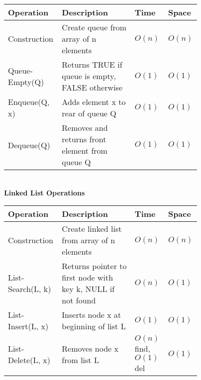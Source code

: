 \documentclass[a4paper]{extarticle}
\begin{document}
\begin{paracol}{3}
{\begin{minipage}[t]{1\linewidth}
\begin{minipage}[t]{1\linewidth}
\begin{tabular}{|p{0.19\linewidth}|p{0.37\linewidth}|p{0.168\linewidth}|p{0.04\linewidth}|}
    \hline
    \textbf{Operation} & \textbf{Description} & \textbf{Time} & \textbf{Space} \\
    \hline
    Construction & Create queue from array of n elements & $O(n)$ & $O(n)$ \\
    \hline
    Queue-Empty(Q) & Returns TRUE if queue is empty, FALSE otherwise & $O(1)$ & $O(1)$ \\
    \hline
    Enqueue(Q, x) & Adds element x to rear of queue Q & $O(1)$ & $O(1)$ \\
    \hline
    Dequeue(Q) & Removes and returns front element from queue Q & $O(1)$ & $O(1)$ \\
    \hline
    \end{tabular}\\
    \textbf{Linked List Operations}\\
    \begin{tabular}{|p{0.19\linewidth}|p{0.37\linewidth}|p{0.168\linewidth}|p{0.04\linewidth}|}
    \hline
    \textbf{Operation} & \textbf{Description} & \textbf{Time} & \textbf{Space} \\
    \hline
    Construction & Create linked list from array of n elements & $O(n)$ & $O(n)$ \\
    \hline
    List-Search(L, k) & Returns pointer to first node with key k, NULL if not found & $O(n)$ & $O(1)$ \\
    \hline
    List-Insert(L, x) & Inserts node x at beginning of list L & $O(1)$ & $O(1)$ \\
    \hline
    List-Delete(L, x) & Removes node x from list L & $O(n)$ find, $O(1)$ del & $O(1)$ \\
    \hline
    \end{tabular}\\
    \end{minipage}
    \end{minipage}
    }
  \end{paracol}
  
\end{document}
